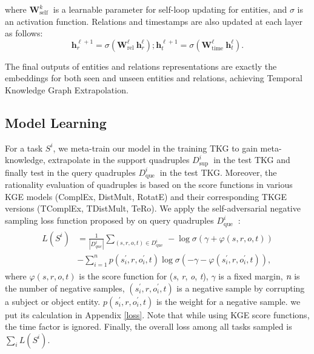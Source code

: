 \documentclass[sigconf]{acmart}
\begin{document}
where $\mathbf{W}_{\text {self }}^{k}$ is a learnable parameter for self-loop updating for entities, and $\sigma$ is an activation function. Relations and timestamps are also updated at each layer as follows:
\begin{equation}
\mathbf{h}_{r}^{\ell+1}=\sigma\left( \mathbf{W}_{\text {rel }}^{\ell} \mathbf{h}_{r}^{\ell} \right) ;   \mathbf{h}_{t}^{\ell+1}=\sigma\left( \mathbf{W}_{\text {time }}^{\ell} \mathbf{h}_{t}^{\ell} \right).
\end{equation}
\par
The final outputs of entities and relations representations are exactly the embeddings for both seen and unseen entities and relations, achieving Temporal Knowledge Graph Extrapolation.

\subsection{Model Learning}
\par
For a task $ {S}^{i}$, we meta-train our model in the training TKG to gain meta-knowledge,  extrapolate in the support quadruples $ {D}_{\text {sup }}^{i}$ in the test TKG and finally test in the query quadruples $ {D}_{\text {que }}^{i}$ in the test TKG. Moreover, the rationality evaluation of quadruples is based on the score functions in various KGE models (ComplEx, DistMult, RotatE) and their corresponding TKGE versions (TComplEx, TDistMult, TeRo). We apply the self-adversarial negative sampling loss function proposed by \citep{RotatE} on query quadruples $ {D}_{\text {que }}^{i}$ :
{
\begin{equation}
\begin{aligned}
\begin{split}
 {L}\left( {S}^{i}\right)&= \frac{1}{\left| {D}_{q u e}^{i}\right|} \sum_{(s, r, o, t) \in  {D}_{\text {que }}^{i}}-\log \sigma(\gamma+\varphi (s, r, o, t)) \\
&-\sum_{i=1}^{n} p\left(s_{i}^{\prime}, r, o_{i}^{\prime}, t\right) \log \sigma\left(-\gamma-\varphi \left(s_{i}^{\prime}, r, o_{i}^{\prime}, t\right)\right),
\end{split}
\label{rotateloss}
\end{aligned}
\end{equation}
}
where $\varphi (s, r, o, t)$ is the score function for (\emph{s}, \emph{r}, \emph{o}, \emph{t}), $\gamma$ is a fixed margin, $\emph{n}$ is the number of negative samples, $\left(s_{i}^{\prime}, r, o_{i}^{\prime}, t\right)$ is a negative sample by corrupting a subject or object entity. $p\left(s_{i}^{\prime}, r, o_{i}^{\prime}, t\right)$ is the weight for a negative sample. we put its calculation in Appendix \ref{loss}. Note that while using KGE score functions, the time factor is ignored.  Finally, the overall loss among all tasks sampled 
is  $\sum_{i}  {L}\left( {S}^{i}\right)$.
\end{document}
